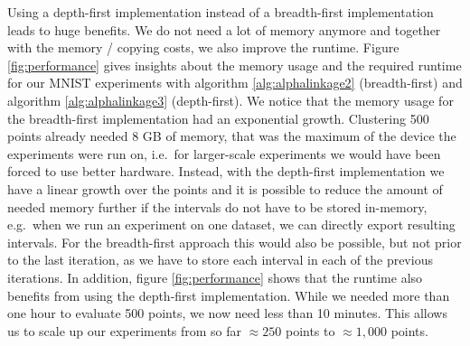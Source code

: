 Using a depth-first implementation instead of a breadth-first implementation leads to huge benefits. We do not need a lot of memory anymore and together with the memory / copying costs, we also improve the runtime. Figure \ref{fig:performance} gives insights about the memory usage and the required runtime for our MNIST experiments with algorithm \ref{alg:alphalinkage2} (breadth-first) and algorithm \ref{alg:alphalinkage3} (depth-first). We notice that the memory usage for the breadth-first implementation had an exponential growth. Clustering 500 points already needed 8 GB of memory, that was the maximum of the device the experiments were run on, i.e.\ for larger-scale experiments we would have been forced to use better hardware. Instead, with the depth-first implementation we have a linear growth over the points and it is possible to reduce the amount of needed memory further if the intervals do not have to be stored in-memory, e.g.\ when we run an experiment on one dataset, we can directly export resulting intervals. For the breadth-first approach this would also be possible, but not prior to the last iteration, as we have to store each interval in each of the previous iterations. In addition, figure \ref{fig:performance} shows that the runtime also benefits from using the depth-first implementation. While we needed more than one hour to evaluate 500 points, we now need less than 10 minutes. This allows us to scale up our experiments from so far $\approx 250$ points to $\approx 1,000$ points.


